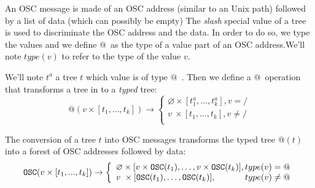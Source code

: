 \documentclass[runningheads,a4paper]{llncs}
\makeatletter
\newcommand{\llist}	[1]		{\ensuremath{[#1_1,...,#1_k]}}
\newcommand{\forest}	{\ensuremath{\varnothing}}
\newcommand{\toType}	{\ensuremath{\mathcal{T}}}
\newcommand{\toAddress}	{\ensuremath{\text{@}}}
\newcommand{\toOSCAddress}	{\ensuremath{\texttt{OSC}}}
\newcommand{\taddress}	{\ensuremath{\text{@}}}
\newcommand{\toData}	{\ensuremath{\text{D}}}
\newcommand{\tdata}	    {\ensuremath{\text{D}}}
\newcommand{\etc}		{\ensuremath{\text{…}}}
\makeatother
\begin{document}
An OSC message is made of an OSC address (similar to an Unix path) followed by a list of data (which can possibly be empty)
The \emph{slash} special value of a tree is used to discriminate the OSC address and the data. In order to do so, we type the values and we define \taddress\ as the type of a value part of an OSC address.We'll note $type(v)$ to refer to the type of the value $v$.

We'll note $t^a$ a tree $t$ which value is of type \taddress\ .
Then we define a \toAddress\ operation that transforms a tree in to a \emph{typed} tree:
\[
    \toAddress (v \times \llist{t}) \to 
\left\{
\begin{array}{l}
	\forest \times \llist{t^a} , v = /\\
	v \ \times \llist{t} , v \neq / \\
\end{array}
\right.
\]

The conversion of a tree $t$ into OSC messages transforms the typed tree $\toAddress (t)$ into a forest of OSC addresses followed by data:
\[
    \toOSCAddress (v \times \llist{t}) \to
\left\{
\begin{array}{l}
	\forest \times [ v \times \toOSCAddress(t_1),\etc , v \times \toOSCAddress(t_k)] , type(v) = \taddress\\
	v \ \times [ \toOSCAddress(t_1),\etc , \toOSCAddress(t_k)] , \hspace{12mm} type(v) \neq \taddress \\
\end{array}
\right.
\]





\end{document}
